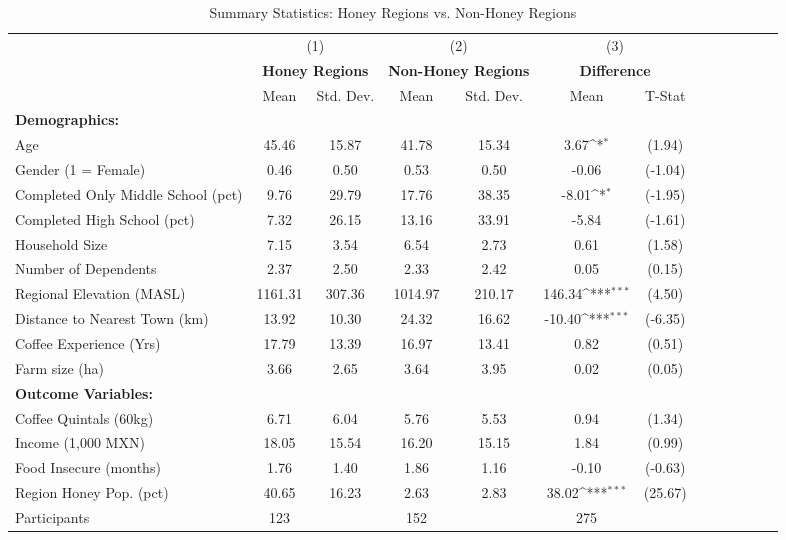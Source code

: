 \begin{table}[htbp]\centering \small
\def\sym#1{\ifmmode^{#1}\else\(^{#1}\)\fi}
\caption{Summary Statistics: Honey Regions vs. Non-Honey Regions \label{summary_region}}
\begin{tabular}{l*{3}{cccc}}
\toprule
                &\multicolumn{2}{c}{(1)}&\multicolumn{2}{c}{(2)}&\multicolumn{2}{c}{(3)}     \\
                &\multicolumn{2}{c}{\textbf{Honey Regions}}&\multicolumn{2}{c}{\textbf{Non-Honey Regions}}&\multicolumn{2}{c}{\textbf{Difference}}\\
                &     Mean&Std. Dev.&     Mean&Std. Dev.&     Mean         &   T-Stat\\
\midrule
\textbf{Demographics:}&         &         &         &         &                  &         \\
\addlinespace
Age             &    45.46&    15.87&    41.78&    15.34&     3.67\sym{*}  &   (1.94)\\
\addlinespace
Gender (1 = Female)&     0.46&     0.50&     0.53&     0.50&    -0.06         &  (-1.04)\\
\addlinespace
Completed Only Middle School (pct)&     9.76&    29.79&    17.76&    38.35&    -8.01\sym{*}  &  (-1.95)\\
\addlinespace
Completed High School (pct)&     7.32&    26.15&    13.16&    33.91&    -5.84         &  (-1.61)\\
\addlinespace
Household Size  &     7.15&     3.54&     6.54&     2.73&     0.61         &   (1.58)\\
\addlinespace
Number of Dependents&     2.37&     2.50&     2.33&     2.42&     0.05         &   (0.15)\\
\addlinespace
Regional Elevation (MASL)&  1161.31&   307.36&  1014.97&   210.17&   146.34\sym{***}&   (4.50)\\
\addlinespace
Distance to Nearest Town (km)&    13.92&    10.30&    24.32&    16.62&   -10.40\sym{***}&  (-6.35)\\
\addlinespace
Coffee Experience (Yrs)&    17.79&    13.39&    16.97&    13.41&     0.82         &   (0.51)\\
\addlinespace
Farm size (ha)  &     3.66&     2.65&     3.64&     3.95&     0.02         &   (0.05)\\
\addlinespace
\textbf{Outcome Variables:}&         &         &         &         &                  &         \\
\addlinespace
Coffee Quintals (60kg)&     6.71&     6.04&     5.76&     5.53&     0.94         &   (1.34)\\
\addlinespace
Income (1,000 MXN)&    18.05&    15.54&    16.20&    15.15&     1.84         &   (0.99)\\
\addlinespace
Food Insecure (months)&     1.76&     1.40&     1.86&     1.16&    -0.10         &  (-0.63)\\
\addlinespace
Region Honey Pop. (pct)&    40.65&    16.23&     2.63&     2.83&    38.02\sym{***}&  (25.67)\\
\midrule
Participants    &      123&         &      152&         &      275         &         \\
\bottomrule
\end{tabular}
\end{table}
